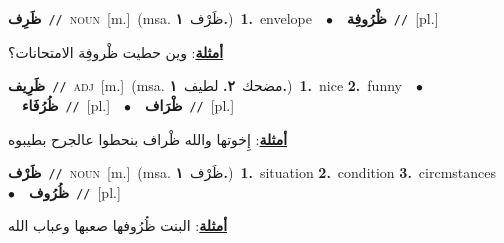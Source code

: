 \documentclass[10pt,a4paper,twoside]{article} %
\begin{document}
\begin{multicols}{2}
{{{\setlength\topsep{0pt}\textbf{\foreignlanguage{arabic}{ظَرِف}}\ {\color{gray}\texttt{//}\color{black}}\ \textsc{noun}\ [m.]\ \color{gray}(msa. \foreignlanguage{arabic}{ظَرْف}~\foreignlanguage{arabic}{\textbf{١.}})\color{black}\ \textbf{1.}~envelope\ \ $\bullet$\ \ \setlength\topsep{0pt}\textbf{\foreignlanguage{arabic}{ظْرُوفِة}}\ {\color{gray}\texttt{//}\color{black}}\ [pl.]\  \begin{flushright}\color{gray}\foreignlanguage{arabic}{\textbf{\underline{\foreignlanguage{arabic}{أمثلة}}}: وين حطيت ظْروفِة الامتحانات؟}\end{flushright}\color{black}} \vspace{2mm}

{\setlength\topsep{0pt}\textbf{\foreignlanguage{arabic}{ظَرِيف}}\ {\color{gray}\texttt{//}\color{black}}\ \textsc{adj}\ [m.]\ \color{gray}(msa. \foreignlanguage{arabic}{مضحك}~\foreignlanguage{arabic}{\textbf{٢.}}  \foreignlanguage{arabic}{لطيف}~\foreignlanguage{arabic}{\textbf{١.}})\color{black}\ \textbf{1.}~nice  \textbf{2.}~funny\ \ $\bullet$\ \ \setlength\topsep{0pt}\textbf{\foreignlanguage{arabic}{ظُرُفَاء}}\ {\color{gray}\texttt{//}\color{black}}\ [pl.]\ \ $\bullet$\ \ \setlength\topsep{0pt}\textbf{\foreignlanguage{arabic}{ظْرَاف}}\ {\color{gray}\texttt{//}\color{black}}\ [pl.]\  \begin{flushright}\color{gray}\foreignlanguage{arabic}{\textbf{\underline{\foreignlanguage{arabic}{أمثلة}}}: إِخوتها والله ظْراف بنحطوا عالجرح بطيبوه}\end{flushright}\color{black}} \vspace{2mm}

{\setlength\topsep{0pt}\textbf{\foreignlanguage{arabic}{ظَرْف}}\ {\color{gray}\texttt{//}\color{black}}\ \textsc{noun}\ [m.]\ \color{gray}(msa. \foreignlanguage{arabic}{ظَرْف}~\foreignlanguage{arabic}{\textbf{١.}})\color{black}\ \textbf{1.}~situation  \textbf{2.}~condition  \textbf{3.}~circmstances\ \ $\bullet$\ \ \setlength\topsep{0pt}\textbf{\foreignlanguage{arabic}{ظُرُوف}}\ {\color{gray}\texttt{//}\color{black}}\ [pl.]\  \begin{flushright}\color{gray}\foreignlanguage{arabic}{\textbf{\underline{\foreignlanguage{arabic}{أمثلة}}}: البنت ظُرُوفها صعبها وعباب الله}\end{flushright}\color{black}} \vspace{2mm}

}}
\end{multicols}
\end{document}
